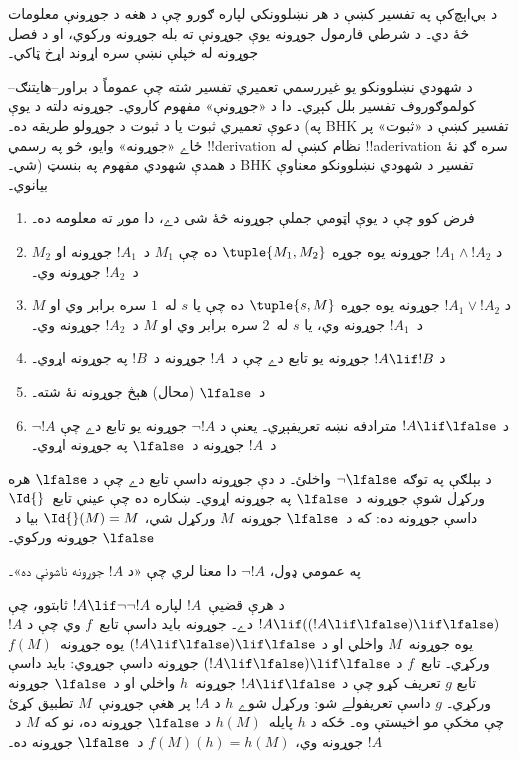 \documentclass[../../../include/open-logic-section]{subfiles}
\begin{document}


\begin{editorial}
  د بي‌اېچ‌کې په تفسير کښې د هر نښلوونکي لپاره ګورو چې د هغه د
  جوړونې معلومات څۀ دي۔ د شرطي فارمول جوړونه يوې جوړونې ته بله
  جوړونه ورکوي، او د فصل جوړونه له خپلې نښې سره اړوند اړخ ټاکي۔
\end{editorial}

د شهودي نښلوونکو يو غيررسمي تعميري تفسير شته چې عموماً د
براور--هايتنګ--کولموګوروف تفسير بلل کېږي۔ دا د «جوړونې» مفهوم کاروي۔
جوړونه دلته د يوې دعوې تعميري ثبوت يا د ثبوت د جوړولو طريقه ده۔ (په BHK تفسير کښې د «ثبوت»
پر ځاے «جوړونه» وايو، څو په رسمي !!{derivation} نظام کښې له
!!a{derivation} سره ګډ نۀ شي۔) د همدې شهودي مفهوم په بنسټ BHK تفسير
د شهودي نښلوونکو معناوې بيانوي۔

\begin{enumerate}
\item فرض کوو چې د يوې اټومي جملې جوړونه څۀ شی دے، دا موږ ته معلومه ده۔
\item د $!A_1 \land !A_2$ جوړونه يوه جوړه $\tuple{M_1, M_2}$ ده
  چې $M_1$ د~$!A_1$ جوړونه او $M_2$ د~$!A_2$ جوړونه وي۔
\item د $!A_1 \lor !A_2$ جوړونه يوه جوړه $\tuple{s, M}$ ده
  چې يا $s$ له~$1$ سره برابر وي او $M$ د~$!A_1$ جوړونه وي، يا $s$
  له~$2$ سره برابر وي او $M$ د~$!A_2$ جوړونه وي۔
\item د $!A \lif !B$ جوړونه يو تابع دے چې د~$!A$ جوړونه
  د~$!B$ په جوړونه اړوي۔
\item د~$\lfalse$ (محال) هېڅ جوړونه نۀ شته۔
\item $\lnot !A$ د $!A \lif \lfalse$ مترادفه نښه تعريفېږي۔ يعنې
  د $\lnot !A$ جوړونه يو تابع دے چې د~$!A$ جوړونه د~$\lfalse$
  په جوړونه اړوي۔
\end{enumerate}

\begin{ex}
د بېلګې په توګه $\lnot \lfalse$ واخلئ۔ د دې جوړونه داسې تابع دے
چې د $\lfalse$ هره ورکړل شوې جوړونه د~$\lfalse$ په جوړونه اړوي۔
ښکاره ده چې عيني تابع~$\Id{}$ داسې جوړونه ده: که د~$\lfalse$
جوړونه~$M$ ورکړل شي، $\Id{}(M) = M$ بيا د~$\lfalse$ جوړونه ورکوي۔
\end{ex}

په عمومي ډول، $\lnot !A$ دا معنا لري چې «د $!A$ جوړونه ناشونې ده»۔

\begin{ex}
د هرې قضيې~$!A$ لپاره $!A \lif \lnot \lnot !A$ ثابتوو، چې
$!A \lif ((!A \lif \lfalse) \lif \lfalse)$ دے۔ جوړونه بايد داسې
تابع~$f$ وي چې د $!A$ يوه جوړونه~$M$ واخلي او د
$(!A \lif \lfalse) \lif \lfalse$ يوه جوړونه~$f(M)$ ورکړي۔
تابع~$f$ د $(!A \lif \lfalse) \lif \lfalse$ جوړونه داسې جوړوي:
بايد داسې تابع $g$ تعريف کړو چې د $!A \lif \lfalse$ جوړونه~$h$
واخلي او د~$\lfalse$ جوړونه ورکړي۔ $g$ داسې تعريفولے شو: ورکړل شوے
$h$ د $!A$ پر هغې جوړونې~$M$ تطبيق کړئ چې مخکې مو اخيستې وه۔ ځکه د
$h$ پايله~$h(M)$ د $\lfalse$ جوړونه ده، نو که $M$ د~$!A$ جوړونه
وي، $f(M)(h) = h(M)$ د~$\lfalse$ جوړونه ده۔
\end{ex}
\end{document}
